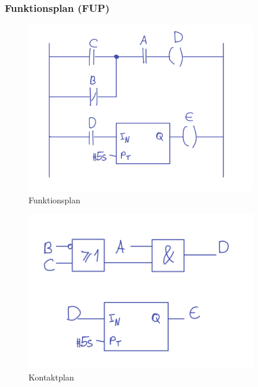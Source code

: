 \subsubsection{Funktionsplan (FUP)}
\begin{figure}[H]
  \includegraphics[width=10cm]{images/KA160322/6a.png}
  \centering
  \caption{Funktionsplan}
\end{figure}

\begin{figure}[H]
  \includegraphics[width=10cm]{images/KA160322/6a_2.png}
  \centering
  \caption{Kontaktplan}
\end{figure}